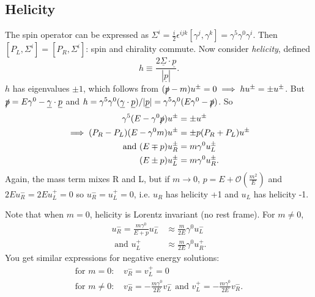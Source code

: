 \documentclass[a4paper,12pt]{article}
\begin{document}
\subsection{Helicity}
The spin operator can be expressed as $\Sigma^i = \frac{i}{2} \epsilon^{ijk}[\gamma^j, \gamma^k] = \gamma^5\gamma^0\gamma^i$. Then $[P_L, \Sigma^i] = [P_R, \Sigma^i]$: spin and chirality commute. Now consider \textit{helicity}, defined 
\begin{equation}
    h \equiv \frac{2\underline{\Sigma} \cdot \underline{p}}{|\underline{p}|}.
\end{equation}
$h$ has eigenvalues $\pm1$, which follows from $(\slashed{p} - m)u^\pm = 0 \implies hu^\pm = \pm u^\pm$. But $\slashed{p} = E\gamma^0 - \underline{\gamma}\cdot\underline{p}$ and $h = \gamma^5\gamma^0 (\underline{\gamma}\cdot\underline{p})/|\underline{p}| = \gamma^5\gamma^0(E\gamma^0 - \slashed{p})$. So
%
\begin{equation}
\begin{split}
\gamma^5(E - \gamma^0\slashed{p})u^\pm &= \pm u^\pm \\
\implies (P_R-P_L)(E-\gamma^0m)u^\pm &= \pm p(P_R + P_L)u^\pm \\
\text{ and } (E \mp p)u_R^\pm &= m\gamma^0 u_L^\pm \\
             (E \pm p)u_L^\pm &= m\gamma^0 u_R^\pm. 
\end{split}
\end{equation}
Again, the mass term mixes R and L, but if $m \to 0$, $p = E + \mathcal{O}(\frac{m^2}{E})$ and $2E u_R^- = 2E u_L^+ = 0$ so $u_R^- = u_L^+ = 0$, i.e. $u_R$ has helicity +1 and $u_L$ has helicity -1. 

Note that when $m=0$, helicity is Lorentz invariant (no rest frame). For $m \neq 0$, 
\begin{equation}
\begin{split}
    u_R^- = \frac{m\gamma^0}{E+p}u_L^- &\approx \frac{m}{2E}\gamma^0u_L^- \\
    \text{ and } u_L^+ &\approx \frac{m}{2E}\gamma^0u_R^+.
\end{split}
\end{equation}
You get similar expressions for negative energy solutions:
\begin{equation}
\begin{split}
\text{for $m = 0$:   } &v_R^- = v_L^+ = 0 \\
\text{for $m \neq 0$:    }  &v_R^- = -\frac{m\gamma^0}{2E}v_L^- \text{ and } v_L^+ = -\frac{m\gamma^0}{2E}v_R^-.
\end{split}
\end{equation}
%
\end{document}
